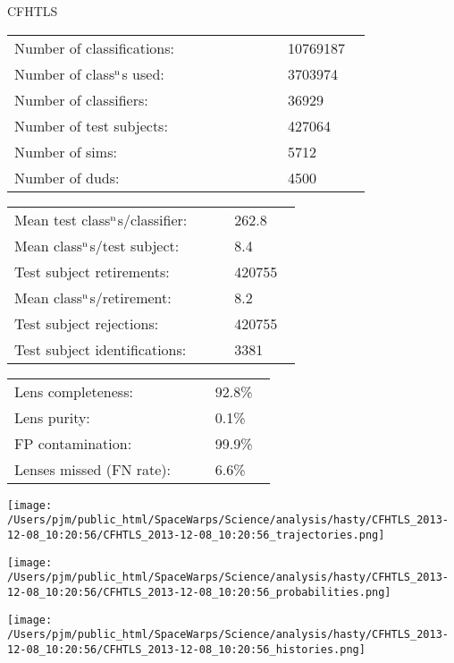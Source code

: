 \documentclass[letterpaper,12pt]{article}
\begin{document}
\begin{minipage}{0.42\linewidth}
{\LARGE CFHTLS}\newline
\medskip

\begin{tabular}{|p{0.65\linewidth}p{0.2\linewidth}|}
\hline
Number of classifications:         & 10769187   \\ 
Number of class$^{\rm n}$s used:  & 3703974   \\ 
Number of classifiers:             & 36929   \\ 
Number of test subjects:           & 427064   \\ 
Number of sims:                    & 5712   \\ 
Number of duds:                    & 4500   \\ 
\hline
\end{tabular}
\begin{tabular}{|p{0.65\linewidth}p{0.2\linewidth}|}
\hline
Mean test class$^{\rm n}$s/classifier: & 262.8 \\ 
Mean class$^{\rm n}$s/test subject:    & 8.4 \\ 
Test subject retirements:               & 420755   \\ 
Mean class$^{\rm n}$s/retirement:      & 8.2 \\ 
Test subject rejections:                & 420755   \\ 
Test subject identifications:           & 3381   \\ 
\hline
\end{tabular}
\begin{tabular}{|p{0.65\linewidth}p{0.2\linewidth}|}
\hline
Lens completeness:         & 92.8\% \\ 
Lens purity:               & 0.1\% \\ 
FP contamination:          & 99.9\% \\ 
Lenses missed (FN rate):   & 6.6\% \\ 
\hline
\end{tabular}
\end{minipage}\hfill
\begin{minipage}{0.56\linewidth}
\texttt{[image: /Users/pjm/public\_html/SpaceWarps/Science/analysis/hasty/CFHTLS\_2013-12-08\_10:20:56/CFHTLS\_2013-12-08\_10:20:56\_trajectories.png]}
\end{minipage}

\vspace{-1\baselineskip}
\begin{minipage}{\linewidth}
\begin{minipage}{0.48\linewidth}
\texttt{[image: /Users/pjm/public\_html/SpaceWarps/Science/analysis/hasty/CFHTLS\_2013-12-08\_10:20:56/CFHTLS\_2013-12-08\_10:20:56\_probabilities.png]}
\end{minipage}
\begin{minipage}{0.48\linewidth}
\texttt{[image: /Users/pjm/public\_html/SpaceWarps/Science/analysis/hasty/CFHTLS\_2013-12-08\_10:20:56/CFHTLS\_2013-12-08\_10:20:56\_histories.png]}
\end{minipage}
\end{minipage}
\end{document}
